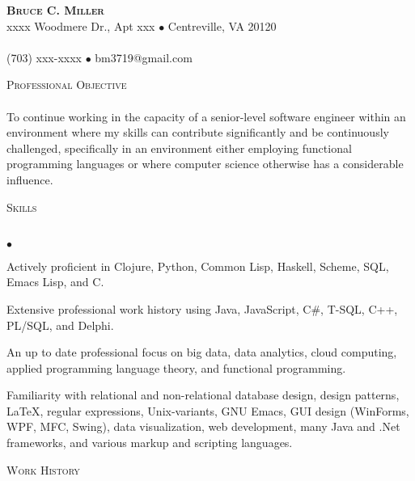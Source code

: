 \documentclass{article}
\newcommand{\lineunder}{\vspace*{-8pt} \\ \hspace*{-18pt} \hrulefill \\}
\newcommand{\header}[1]{{\hspace*{-15pt}\vspace*{7pt} \textsc{#1}} \vspace*{-7pt} \lineunder}
\newcommand{\contact}[3]{
\vspace*{-8pt}
\begin{center}
{\LARGE \scshape {#1}}\\
#2 \lineunder
#3
\end{center}
\vspace*{-8pt}
}
\newenvironment{achievements}{\begin{list}{$\bullet$}{\topsep 0pt \itemsep
      -2pt}}{\vspace*{4pt}\end{list}}
\begin{document}
\small
\smallskip
\vspace*{-44pt}

\contact{\textbf{Bruce C. Miller}}
{xxxx Woodmere Dr., Apt xxx $\bullet$ Centreville, VA 20120}
{(703) xxx-xxxx $\bullet$ bm3719@gmail.com}

\header{Professional Objective} To continue working in the capacity of a
senior-level software engineer within an environment where my skills can
contribute significantly and be continuously challenged, specifically in an
environment either employing functional programming languages or where computer
science otherwise has a considerable influence.
\vspace{7pt}

\header{Skills}
\begin{achievements}
\item Actively proficient in Clojure, Python, Common Lisp, Haskell, Scheme,
  SQL, Emacs Lisp, and C.
\item Extensive professional work history using Java, JavaScript, C\#, T-SQL,
  C++, PL/SQL, and Delphi.
\item An up to date professional focus on big data, data analytics, cloud
  computing, applied programming language theory, and functional programming.
\item Familiarity with relational and non-relational database design, design
  patterns, \LaTeX, regular expressions, Unix-variants, GNU Emacs, GUI design
  (WinForms, WPF, MFC, Swing), data visualization, web development, many Java
  and .Net frameworks, and various markup and scripting languages.
\end{achievements}

\header{Work History}
\end{document}
